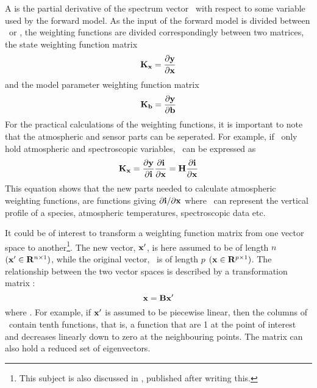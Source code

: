  A  is the partial derivative of the
 spectrum vector \MsrVct\ with respect to some variable used by the
 forward model. As the input of the forward model is divided between
 \SttVct\ or \FrwMdlVct, the weighting functions are divided
 correspondingly between two matrices, the state weighting function
 matrix
 \begin{equation}
   \mathbf{K}_{\mathbf{x}} = \frac{\partial \mathbf{y}}{\partial \mathbf{x}}
  \label{eq:formalism:kx}
 \end{equation}
 and the model parameter weighting function matrix
 \begin{equation}
   \mathbf{K}_{\mathbf{b}} = \frac{\partial \mathbf{y}}{\partial \mathbf{b}}
  \label{eq:formalism:kb}
 \end{equation}
 For the practical calculations of the weighting functions, it is
 important to note that the atmospheric and sensor parts can be
 seperated. For example, if \SttVct\ only hold atmospheric and
 spectroscopic variables, \aWfnMtr{\SttVct}\ can be expressed as
 \begin{equation}
   \mathbf{K}_{\mathbf{x}} = \frac{\partial \mathbf{y}}{\partial \mathbf{i}}
                 \frac{\partial \mathbf{i}}{\partial \mathbf{x}} =
         \mathbf{H} \frac{\partial \mathbf{i}}{\partial \mathbf{x}}
  \label{eq:formalism:kx2}
 \end{equation}
 This equation shows that the new parts needed to calculate
 atmospheric weighting functions, are functions giving $\partial\mathbf{i} /
 \partial \mathbf{x}$ where \SttVct\ can represent the vertical profile of a
 species, atmospheric temperatures, spectroscopic data etc.


 
 It could be of interest to transform a weighting function matrix from
 one vector space to another\footnote{This subject is also discussed
   in \citet{rodgers:00}, published after writing this.}. The new
 vector, $\mathbf{x}'$, is here assumed to be of length $n$ $(\mathbf{x}' \in
 \mathbf{R}^{n \times 1})$, while the original vector, \SttVct\ is of length $p$
 $(\mathbf{x} \in \mathbf{R}^{p \times 1})$. The relationship between the two vector
 spaces is described by a transformation matrix \VctTrfMtr:
  \begin{equation}
    \mathbf{x} = \mathbf{B} \mathbf{x}'
  \end{equation}
  where \VctTrfMtr \SzeSmb {}. For example, if $\mathbf{x}'$
  is assumed to be piecewise linear, then the columns of \VctTrfMtr\ contain
  tenth functions, that is, a function that are 1 at the point of
  interest and decreases linearly down to zero at the neighbouring
  points.  The matrix can also hold a reduced set of eigenvectors.
    
